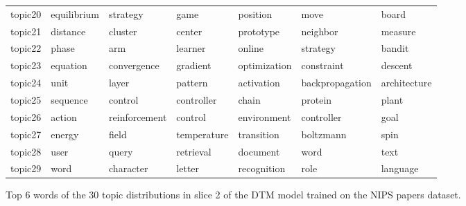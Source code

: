 \documentclass[letterpaper]{article}
\begin{document}
\begin{figure}[ht]
\begin{tabular}{l | l l l l l l}
    topic20 & 	equilibrium & 	strategy & 	game & 	position & 	move & 	board \\
    topic21 & 	distance & 	cluster & 	center & 	prototype & 	neighbor & 	measure \\
    topic22 & 	phase & 	arm & 	learner & 	online & 	strategy & 	bandit \\
    topic23 & 	equation & 	convergence & 	gradient & 	optimization & 	constraint & 	descent \\
    topic24 & 	unit & 	layer & 	pattern & 	activation & 	backpropagation & 	architecture \\
    topic25 & 	sequence & 	control & 	controller & 	chain & 	protein & 	plant \\
    topic26 & 	action & 	reinforcement & 	control & 	environment & 	controller & 	goal \\
    topic27 & 	energy & 	field & 	temperature & 	transition & 	boltzmann & 	spin \\
    topic28 & 	user & 	query & 	retrieval & 	document & 	word & 	text \\
    topic29 & 	word & 	character & 	letter & 	recognition & 	role & 	language \\
  \end{tabular}
  \caption{\label{fig:dtm_slice2} Top 6 words of the 30 topic distributions in slice 2 of the DTM model trained on the NIPS papers dataset.}
\end{figure}
\end{document}
